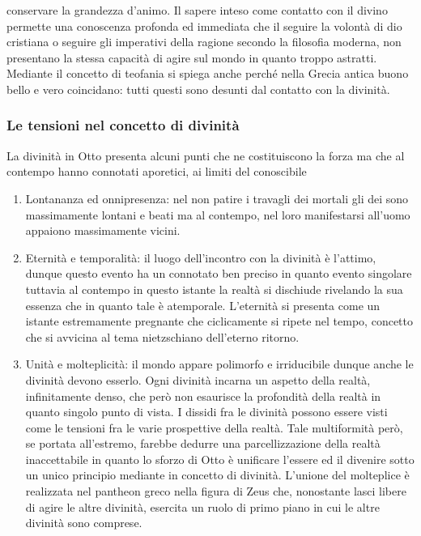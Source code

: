 \documentclass[10pt,a4paper]{article}
\begin{document}
conservare la grandezza d'animo. Il sapere inteso come contatto con il divino permette una conoscenza profonda ed immediata che il seguire la volontà di dio cristiana o seguire gli imperativi della ragione secondo la filosofia moderna, non presentano la stessa capacità di agire sul mondo in quanto troppo astratti. Mediante il concetto di teofania si spiega anche perché nella Grecia antica buono bello e vero coincidano: tutti questi sono desunti dal contatto con la divinità.  
\subsubsection{Le tensioni nel concetto di divinità}
La divinità in Otto presenta alcuni punti che ne costituiscono la forza ma che al contempo hanno connotati aporetici, ai limiti del conoscibile
\begin{enumerate}
\item Lontananza ed onnipresenza: nel non patire i travagli dei mortali gli dei sono massimamente lontani e beati ma al contempo, nel loro manifestarsi all'uomo appaiono massimamente vicini. 
\item Eternità e temporalità: il luogo dell'incontro con la divinità è l'attimo, dunque questo evento ha un connotato ben preciso in quanto evento singolare tuttavia al contempo in questo istante la realtà si dischiude rivelando la sua essenza che in quanto tale è atemporale. L'eternità si presenta come un istante estremamente pregnante che ciclicamente si ripete nel tempo, concetto che si avvicina al tema nietzschiano dell'eterno ritorno.
\item Unità e molteplicità: il mondo appare polimorfo e irriducibile dunque anche le divinità devono esserlo. Ogni divinità incarna un aspetto della realtà, infinitamente denso, che però non esaurisce la profondità della realtà in quanto singolo punto di vista. I dissidi fra le divinità possono essere visti come le tensioni fra le varie prospettive della realtà. Tale multiformità però, se portata all'estremo, farebbe dedurre una parcellizzazione della realtà inaccettabile in quanto lo sforzo di Otto è unificare l'essere ed il divenire sotto un unico principio mediante in concetto di divinità. L'unione del molteplice è realizzata nel pantheon greco nella figura di Zeus che, nonostante lasci libere di agire le altre divinità, esercita un ruolo di primo piano in cui le altre divinità sono comprese.  
\end{enumerate}
\end{document}
